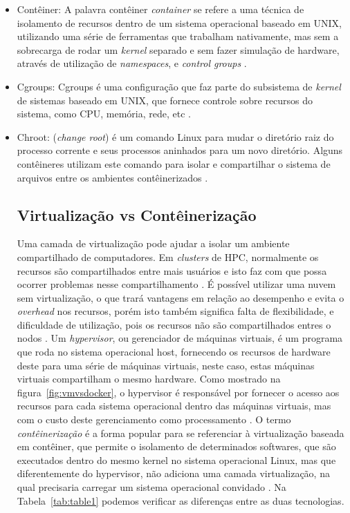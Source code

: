 \documentclass[twoside,english,brazilian]{UNISINOSartigo}
\begin{document}
\begin{itemize}
	\item Contêiner: A palavra contêiner \textit{container} se refere a uma técnica de isolamento de recursos dentro de um sistema operacional baseado em UNIX, utilizando uma série de ferramentas que trabalham nativamente, mas sem a sobrecarga de rodar um \textit{kernel} separado e sem fazer simulação de hardware, através de utilização de \textit{namespaces}, e \textit{control groups} \cite{LXC2016}.
	\item Cgroups: Cgroups é uma configuração que faz parte do subsistema de \textit{kernel} de sistemas baseado em UNIX, que fornece controle sobre recursos do sistema, como CPU, memória, rede, etc  \cite{NICKOLOFF2016}.
	\item Chroot: (\textit{change root}) é um comando Linux para mudar o diretório raiz do processo corrente e seus processos aninhados para um novo diretório. Alguns contêineres utilizam este comando para isolar e compartilhar o sistema de arquivos entre os ambientes contêinerizados \cite{Dua2014}. 

\subsection{Virtualização vs Contêinerização}
\label{virtualization}

Uma camada de virtualização pode ajudar a isolar um ambiente compartilhado de computadores. Em \textit{clusters} de HPC, normalmente os recursos são compartilhados entre mais usuários e isto faz com que possa ocorrer problemas nesse compartilhamento \cite{Xavier2013}. É possível utilizar uma nuvem sem virtualização, o que trará vantagens em relação ao desempenho e evita o \textit{overhead} nos recursos, porém isto também significa falta de flexibilidade, e dificuldade de utilização, pois os recursos não são compartilhados entres o nodos \cite{Kominos2017}.
Um \textit{hypervisor}, ou gerenciador de máquinas virtuais, é um programa que roda no sistema operacional host, fornecendo os recursos de hardware deste para uma série de máquinas virtuais, neste caso, estas máquinas virtuais compartilham o mesmo hardware. Como mostrado na figura~\ref{fig:vmvsdocker}, o hypervisor é responsável por fornecer o acesso aos recursos para cada sistema operacional dentro das máquinas virtuais, mas com o custo deste gerenciamento como processamento \cite{Zhang2016}. O termo \textit{contêinerização} é a forma popular para se referenciar à virtualização baseada em contêiner, que permite o isolamento de determinados softwares, que são executados dentro do mesmo kernel no sistema operacional Linux, mas que diferentemente do hypervisor, não adiciona uma camada virtualização, na qual precisaria carregar um sistema operacional convidado \cite{Zhang2016}.
Na Tabela~\ref{tab:table1} podemos verificar as diferenças entre as duas tecnologias.


\end{itemize}
\end{document}
